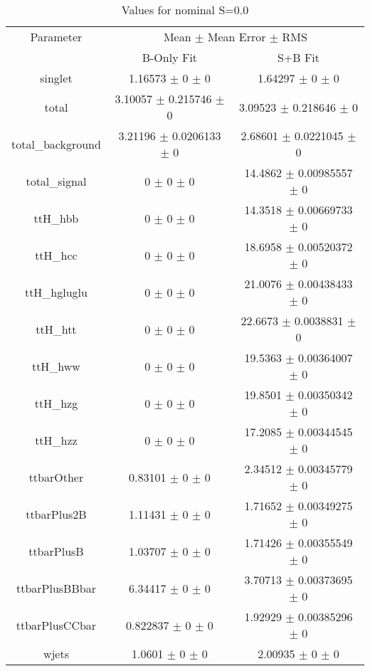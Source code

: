\begin{table}
\centering
\caption{Values for nominal S=0.0}
\begin{tabular}{ccc}
\toprule
Parameter & \multicolumn{2}{c}{Mean $\pm$ Mean Error $\pm$ RMS}\\
 & B-Only Fit & S+B Fit\\
\midrule
singlet & \num{1.16573} $\pm$ \num{0} $\pm$ \num{0} & \num{1.64297} $\pm$ \num{0} $\pm$ \num{0}\\
total & \num{3.10057} $\pm$ \num{0.215746} $\pm$ \num{0} & \num{3.09523} $\pm$ \num{0.218646} $\pm$ \num{0}\\
total\_background & \num{3.21196} $\pm$ \num{0.0206133} $\pm$ \num{0} & \num{2.68601} $\pm$ \num{0.0221045} $\pm$ \num{0}\\
total\_signal & \num{0} $\pm$ \num{0} $\pm$ \num{0} & \num{14.4862} $\pm$ \num{0.00985557} $\pm$ \num{0}\\
ttH\_hbb & \num{0} $\pm$ \num{0} $\pm$ \num{0} & \num{14.3518} $\pm$ \num{0.00669733} $\pm$ \num{0}\\
ttH\_hcc & \num{0} $\pm$ \num{0} $\pm$ \num{0} & \num{18.6958} $\pm$ \num{0.00520372} $\pm$ \num{0}\\
ttH\_hgluglu & \num{0} $\pm$ \num{0} $\pm$ \num{0} & \num{21.0076} $\pm$ \num{0.00438433} $\pm$ \num{0}\\
ttH\_htt & \num{0} $\pm$ \num{0} $\pm$ \num{0} & \num{22.6673} $\pm$ \num{0.0038831} $\pm$ \num{0}\\
ttH\_hww & \num{0} $\pm$ \num{0} $\pm$ \num{0} & \num{19.5363} $\pm$ \num{0.00364007} $\pm$ \num{0}\\
ttH\_hzg & \num{0} $\pm$ \num{0} $\pm$ \num{0} & \num{19.8501} $\pm$ \num{0.00350342} $\pm$ \num{0}\\
ttH\_hzz & \num{0} $\pm$ \num{0} $\pm$ \num{0} & \num{17.2085} $\pm$ \num{0.00344545} $\pm$ \num{0}\\
ttbarOther & \num{0.83101} $\pm$ \num{0} $\pm$ \num{0} & \num{2.34512} $\pm$ \num{0.00345779} $\pm$ \num{0}\\
ttbarPlus2B & \num{1.11431} $\pm$ \num{0} $\pm$ \num{0} & \num{1.71652} $\pm$ \num{0.00349275} $\pm$ \num{0}\\
ttbarPlusB & \num{1.03707} $\pm$ \num{0} $\pm$ \num{0} & \num{1.71426} $\pm$ \num{0.00355549} $\pm$ \num{0}\\
ttbarPlusBBbar & \num{6.34417} $\pm$ \num{0} $\pm$ \num{0} & \num{3.70713} $\pm$ \num{0.00373695} $\pm$ \num{0}\\
ttbarPlusCCbar & \num{0.822837} $\pm$ \num{0} $\pm$ \num{0} & \num{1.92929} $\pm$ \num{0.00385296} $\pm$ \num{0}\\
wjets & \num{1.0601} $\pm$ \num{0} $\pm$ \num{0} & \num{2.00935} $\pm$ \num{0} $\pm$ \num{0}\\
\bottomrule
\end{tabular}
\end{table}